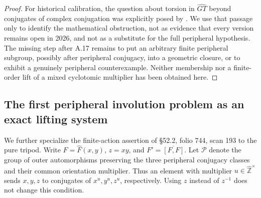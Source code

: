 \begin{proof}
For historical calibration, the question about torsion
in $\widehat{GT}$ beyond conjugates of complex conjugation
was explicitly posed by
\citet[\S1.4(4), p.~190]{Schneps1997Survey}. We use that
passage only to identify the mathematical obstruction,
not as evidence that every version remains open in 2026,
and not as a substitute for the full peripheral hypothesis.
The missing step after A.17 remains to put an arbitrary
finite peripheral subgroup, possibly after peripheral
conjugacy, into a geometric closure, or to exhibit a
genuinely peripheral counterexample. Neither membership
nor a finite-order lift of a mixed cyclotomic multiplier
has been obtained here.
\end{proof}

\subsection{The first peripheral involution problem as an exact lifting system}

We further specialize the finite-action assertion of \S52.2,
folio 744, scan 193 to the pure tripod. Write
$F=\widehat F(x,y)$, $z=xy$, and
$F'=\overline{[F,F]}$. Let $\mathcal P$ denote the group of
outer automorphisms preserving the three peripheral conjugacy
classes and their common orientation multiplier. Thus an element
with multiplier $u\in\widehat{\mathbb Z}^{\times}$ sends
$x,y,z$ to conjugates of $x^u,y^u,z^u$, respectively.
Using $z$ instead of $z^{-1}$ does not change this condition.

